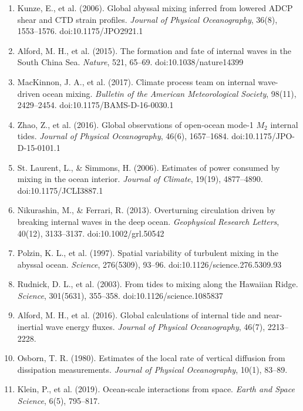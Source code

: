\documentclass[11pt,a4paper]{article}
\begin{document}
\begin{enumerate}[leftmargin=*,itemsep=2pt,topsep=0pt]
\item Kunze, E., et al. (2006). Global abyssal mixing inferred from lowered ADCP shear and CTD strain profiles. \textit{Journal of Physical Oceanography}, 36(8), 1553--1576. doi:10.1175/JPO2921.1

\item Alford, M. H., et al. (2015). The formation and fate of internal waves in the South China Sea. \textit{Nature}, 521, 65--69. doi:10.1038/nature14399

\item MacKinnon, J. A., et al. (2017). Climate process team on internal wave-driven ocean mixing. \textit{Bulletin of the American Meteorological Society}, 98(11), 2429--2454. doi:10.1175/BAMS-D-16-0030.1

\item Zhao, Z., et al. (2016). Global observations of open-ocean mode-1 $M_2$ internal tides. \textit{Journal of Physical Oceanography}, 46(6), 1657--1684. doi:10.1175/JPO-D-15-0101.1

\item St. Laurent, L., \& Simmons, H. (2006). Estimates of power consumed by mixing in the ocean interior. \textit{Journal of Climate}, 19(19), 4877--4890. doi:10.1175/JCLI3887.1

\item Nikurashin, M., \& Ferrari, R. (2013). Overturning circulation driven by breaking internal waves in the deep ocean. \textit{Geophysical Research Letters}, 40(12), 3133--3137. doi:10.1002/grl.50542

\item Polzin, K. L., et al. (1997). Spatial variability of turbulent mixing in the abyssal ocean. \textit{Science}, 276(5309), 93--96. doi:10.1126/science.276.5309.93

\item Rudnick, D. L., et al. (2003). From tides to mixing along the Hawaiian Ridge. \textit{Science}, 301(5631), 355--358. doi:10.1126/science.1085837

\item Alford, M. H., et al. (2016). Global calculations of internal tide and near-inertial wave energy fluxes. \textit{Journal of Physical Oceanography}, 46(7), 2213--2228.

\item Osborn, T. R. (1980). Estimates of the local rate of vertical diffusion from dissipation measurements. \textit{Journal of Physical Oceanography}, 10(1), 83--89.

\item Klein, P., et al. (2019). Ocean-scale interactions from space. \textit{Earth and Space Science}, 6(5), 795--817.


\end{enumerate}
\end{document}
